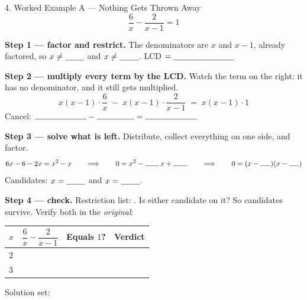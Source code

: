 \documentclass[10pt]{article}
\begin{document}
\begin{notesbox}{4. Worked Example A --- Nothing Gets Thrown Away}
\[ \frac{6}{x}-\frac{2}{x-1}=1 \]

\textbf{Step 1 --- factor and restrict.} The denominators are $x$ and $x-1$, already factored, so
$x\neq\blank{0.8cm}$ and $x\neq\blank{0.8cm}$. \; LCD $=\blank{2.6cm}$

\vspace{4pt}
\textbf{Step 2 --- multiply every term by the LCD.} Watch the term on the right: it has no denominator,
and it still gets multiplied.
\[ x(x-1)\cdot\frac{6}{x} \;-\; x(x-1)\cdot\frac{2}{x-1} \;=\; x(x-1)\cdot 1 \]
Cancel: \quad $\rule{2.2cm}{0.4pt}-\rule{1.6cm}{0.4pt}=\rule{2.2cm}{0.4pt}$

\vspace{4pt}
\textbf{Step 3 --- solve what is left.} Distribute, collect everything on one side, and factor.
\[ 6x-6-2x=x^2-x \qquad\Longrightarrow\qquad 0=x^2-\rule{0.7cm}{0.4pt}\,x+\rule{0.7cm}{0.4pt}
   \qquad\Longrightarrow\qquad 0=(x-\rule{0.5cm}{0.4pt})(x-\rule{0.5cm}{0.4pt}) \]
Candidates: $x=\blank{0.8cm}$ and $x=\blank{0.8cm}$.

\vspace{4pt}
\textbf{Step 4 --- check.} Restriction list: \blank{2.0cm}. \; Is either candidate on it?
\blank{1.0cm} \; So \blank{1.0cm} candidates survive. Verify both in the \emph{original}:
\begin{center}
\renewcommand{\arraystretch}{1.5}
\begin{tabularx}{0.90\linewidth}{|C{1.6cm}|C{3.4cm}|C{2.0cm}|X|}
\hline
{}
\textbf{$x$} & \textbf{$\dfrac{6}{x}-\dfrac{2}{x-1}$} & \textbf{Equals $1$?} & \textbf{Verdict} \\ \hline
$2$ & & & \\ \hline
$3$ & & & \\ \hline
\end{tabularx}
\end{center}
\vspace{-2pt}
Solution set: \blank{3.0cm}
\end{notesbox}
\end{document}
